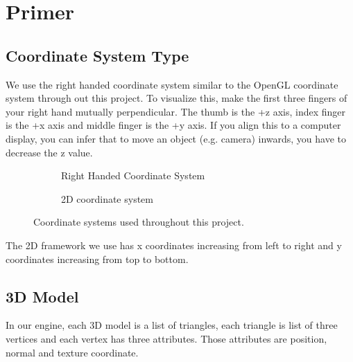 \chapter{Primer}
\section{Coordinate System Type}
We use the right handed coordinate system similar to the OpenGL coordinate system through out this project. To visualize this, make the first three fingers of your right hand mutually perpendicular. The thumb is the +z axis, index finger is the +x axis and middle finger is the +y axis. If you align this to a computer display, you can infer that to move an object (e.g. camera) inwards, you have to decrease the z value.
\begin{figure}[htbp]
    \centering
    \begin{subfigure}[b]{0.45\textwidth}
        \centering
        \caption{Right Handed Coordinate System}
    \end{subfigure}
    \hfill
    \begin{subfigure}[b]{0.45\textwidth}
        \centering
        \caption{2D coordinate system}
    \end{subfigure}
    \caption{Coordinate systems used throughout this project.}
\end{figure}

The 2D framework we use has x coordinates increasing from left to right and y coordinates increasing from top to bottom.
\section{3D Model}
In our engine, each 3D model is a list of triangles, each triangle is list of three vertices and each vertex has three attributes. Those attributes are position, normal and texture coordinate. 
